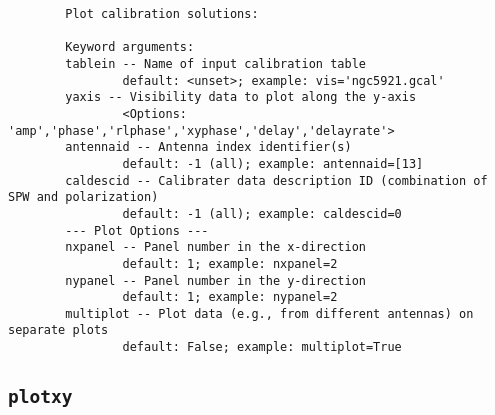 \small
\begin{verbatim}
        Plot calibration solutions: 
        
        Keyword arguments:
        tablein -- Name of input calibration table 
                default: <unset>; example: vis='ngc5921.gcal'
        yaxis -- Visibility data to plot along the y-axis
                <Options: 'amp','phase','rlphase','xyphase','delay','delayrate'>
        antennaid -- Antenna index identifier(s)
                default: -1 (all); example: antennaid=[13]
        caldescid -- Calibrater data description ID (combination of SPW and polarization)
                default: -1 (all); example: caldescid=0
        --- Plot Options ---
        nxpanel -- Panel number in the x-direction
                default: 1; example: nxpanel=2
        nypanel -- Panel number in the y-direction 
                default: 1; example: nypanel=2
        multiplot -- Plot data (e.g., from different antennas) on separate plots
                default: False; example: multiplot=True
\end{verbatim}
\normalsize


\subsection{{\tt plotxy}}
\label{section:tasks.plotxy}


